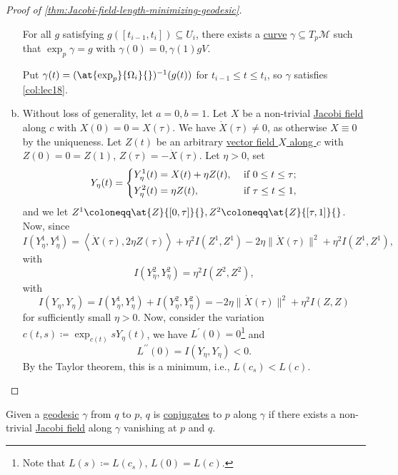 \begin{proof}[Proof of \autoref{thm:Jacobi-field-length-minimizing-geodesic}]
\begin{enumerate}[(a)]
		      \begin{claim}
			      For all \(g\) satisfying \(g([t_{i-1}, t_i]) \subseteq U_i\), there exists a \hyperref[def:curve]{curve} \(\gamma \subseteq T_p \mathcal{M} \) such that \(\exp _p \gamma = g\) with \(\gamma (0) = 0 , \gamma (1) g V\).
		      \end{claim}
		      \begin{explanation}
			      Put \(\gamma (t) = ( \at{\exp _p}{\Omega _i}{} )^{-1} (g(t)) \) for \(t_{i-1} \leq t \leq t_i\), so \(\gamma \) satisfies \autoref{col:lec18}.
		      \end{explanation}
		\item  Without loss of generality, let \(a = 0, b= 1\). Let \(X\) be a non-trivial \hyperref[def:Jacobi-field]{Jacobi field} along \(c\) with \(X(0) = 0 = X(\tau )\). We have \(\dot{X} (\tau ) \neq 0\), as otherwise \(X \equiv 0\) by the uniqueness. Let \(Z(t)\) be an arbitrary \hyperref[def:vector-field-along-curve]{vector field \(X\) along \(c\)} with \(Z(0) = 0 = Z(1)\), \(Z(\tau ) = - \dot{X} (\tau )\). Let \(\eta > 0\), set
		      \[
			      Y_\eta (t) = \begin{dcases}
				      Y_\eta ^1(t) = X(t) + \eta Z(t), & \text{ if } 0 \leq t \leq \tau ; \\
				      Y_\eta ^2(t) = \eta Z(t),        & \text{ if } \tau \leq t \leq 1 ,
			      \end{dcases}
		      \]
		      and we let \(Z^1 \coloneqq \at{Z}{[0, \tau ]}{} , Z^2 \coloneqq \at{Z}{[\tau , 1]}{} \). Now, since
		      \[
			      I(Y_\eta ^1, Y_\eta ^1)
			      = \left\langle \dot{X} (\tau ), 2 \eta Z(\tau ) \right\rangle + \eta ^2 I(Z^1, Z^1) - 2 \eta \lVert \dot{X}(\tau)\rVert^2 + \eta ^2 I(Z^1, Z^1),
		      \]
		      with
		      \[
			      I(Y_\eta ^2, Y_\eta ^2) = \eta ^2 I(Z^2, Z^2),
		      \]
		      with
		      \[
			      I(Y_\eta , Y_\eta ) = I(Y_\eta ^1, Y_\eta ^1) + I(Y_\eta ^2, Y_\eta ^2) = -2 \eta \lVert \dot{X} (\tau ) \rVert ^2 + \eta ^2 I(Z, Z)
		      \]
		      for sufficiently small \(\eta > 0\). Now, consider the variation \(c(t, s) \coloneqq \exp _{c(t)} s Y_\eta (t)\), we have \(L^{\prime} (0) = 0\)\footnote{Note that \(L(s) \coloneqq L(c_s)\), \(L(0) = L(c)\).} and
		      \[
			      L^{\prime\prime} (0) = I(Y_\eta , Y_\eta ) < 0.
		      \]
		      By the Taylor theorem, this is a minimum, i.e., \(L(c_s) < L(c)\).
	\end{enumerate}
\end{proof}

\begin{remark}
	Given a \hyperref[def:geodesic]{geodesic} \(\gamma \) from \(q\) to \(p\), \(q\) is \hyperref[def:conjugate-locus]{conjugates} to \(p\) along \(\gamma \) if there exists a non-trivial \hyperref[def:Jacobi-field]{Jacobi field} along \(\gamma \) vanishing at \(p\) and \(q\).
\end{remark}


